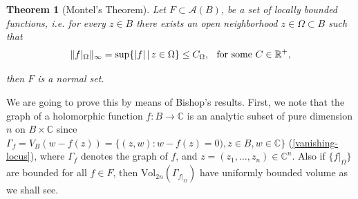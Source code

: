 \documentclass[12pt,twoside,a4paper]{report}
\newtheorem{theorem}{Theorem}[section]
\newcommand{\re}{\ensuremath{\mathbb R }}
\newcommand{\co}{\ensuremath{\mathbb C }}
\newcommand{\con}{\ensuremath{\mathbb{C}^n}}
\begin{document}
  \begin{theorem}[Montel's Theorem] Let $F\subset\mathcal{A}(B)$, be a set of locally bounded functions, i.e.
  for every $z\in B$ there exists an open neighborhood $z\in\Omega\subset B$ such that
  \[
    \| f|_{\Omega}\|_{\infty}=\sup\{|f|\,|\,z\in\Omega\}\leq C_{\Omega},\hspace{0.2cm}\,\text{for some }C\in\re^{+},
  \]

  \noindent then $F$ is a normal set.
  \end{theorem}
  We are going to prove this by means of Bishop's results. First, we note that the graph of a holomorphic function $f:B\rightarrow\co$ is an analytic subset of pure dimension $n$ on $B\times\co$ since $\Gamma_{f}=V_B(w-f(z))=\{(z,w):w-f(z)=0), z\in B, w\in\co\}$ (\ref{vanishing-locus}), where $\Gamma_{f}$ denotes the graph of $f$, and $z=(z_1,\dots,z_n)\in\con$.
  Also if $\{f|_{\Omega}\}$ are bounded for all $f\in F$, then $\textrm{Vol}_{2n}(\Gamma_{f|_{\Omega}})$ have uniformly bounded volume as we shall see.
\end{document}

